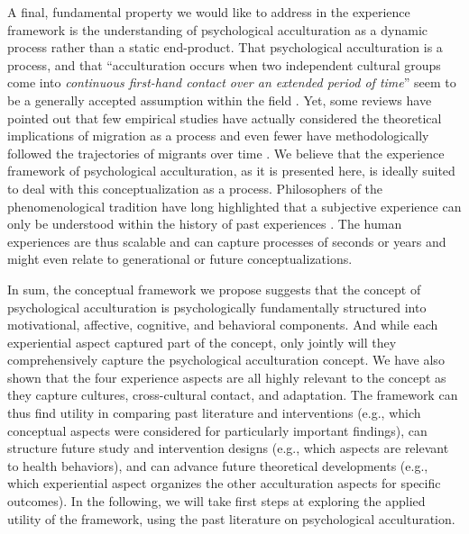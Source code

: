 \documentclass[man, 12pt, a4paper, mask]{apa7}
\begin{document}
A final, fundamental property we would like to address in the experience framework is the understanding of psychological acculturation as a dynamic process rather than a static end-product. That psychological acculturation is a process, and that ``acculturation occurs when two independent cultural groups come into \textit{continuous first-hand contact over an extended period of time}'' \citep[][186]{Berry1989} seem to be a generally accepted assumption within the field \citep[e.g.,][]{Ward2016}. Yet, some reviews have pointed out that few empirical studies have actually considered the theoretical implications of migration as a process and even fewer have methodologically followed the trajectories of migrants over time \citep[][]{Brown2011, Ward2019}. We believe that the experience framework of psychological acculturation, as it is presented here, is ideally suited to deal with this conceptualization as a process. Philosophers of the phenomenological tradition have long highlighted that a subjective experience can only be understood within the history of past experiences \citep[e.g.,][]{Heidegger1978}. The human experiences are thus scalable and can capture processes of seconds or years and might even relate to generational or future conceptualizations.

In sum, the conceptual framework we propose suggests that the concept of psychological acculturation is psychologically fundamentally structured into motivational, affective, cognitive, and behavioral components. And while each experiential aspect captured part of the concept, only jointly will they comprehensively capture the psychological acculturation concept. We have also shown that the four experience aspects are all highly relevant to the concept as they capture cultures, cross-cultural contact, and adaptation. The framework can thus find utility in comparing past literature and interventions (e.g., which conceptual aspects were considered for particularly important findings), can structure future study and intervention designs (e.g., which aspects are relevant to health behaviors), and can advance future theoretical developments (e.g., which experiential aspect organizes the other acculturation aspects for specific outcomes). In the following, we will take first steps at exploring the applied utility of the framework, using the past literature on psychological acculturation. 
\end{document}
